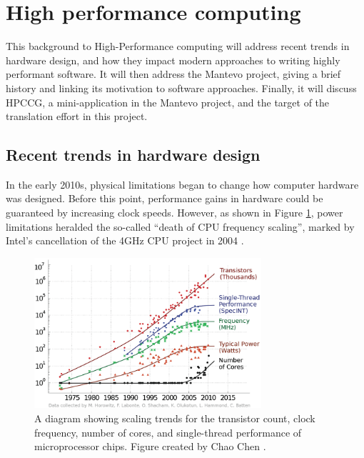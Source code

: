 \section{High performance computing}
\label{sec:hpc}

This background to High-Performance computing will address recent trends in hardware design, and how they impact modern approaches to writing highly performant software. It will then address the Mantevo project, giving a brief history and linking its motivation to software approaches. Finally, it will discuss HPCCG, a mini-application in the Mantevo project, and the target of the translation effort in this project.

\subsection{Recent trends in hardware design}
\label{ssec:hardware-design-trends}

In the early 2010s, physical limitations began to change how computer hardware was designed. Before this point, performance gains in hardware could be guaranteed by increasing clock speeds. However, as shown in Figure \ref{fig:scaling-trends-transistor-clock}, power limitations heralded the so-called ``death of CPU frequency scaling'', marked by Intel's cancellation of the 4GHz CPU project in 2004 \cite{markovLimitsFundamentalLimits2014}.

\begin{figure}[H]
    \centering
    \includegraphics[width=0.75\textwidth]{images/2_background/1-Trends-in-transistor-count-performance-core-count-and-power-over-the-past-decades.png}
    \caption{A diagram showing scaling trends for the transistor count, clock frequency, number of cores, and single-thread performance of microprocessor chips. Figure created by Chao Chen \cite{chenEnergyefficientElectricalSiliconphotonic2014}.}
    \label{fig:scaling-trends-transistor-clock}
\end{figure}


